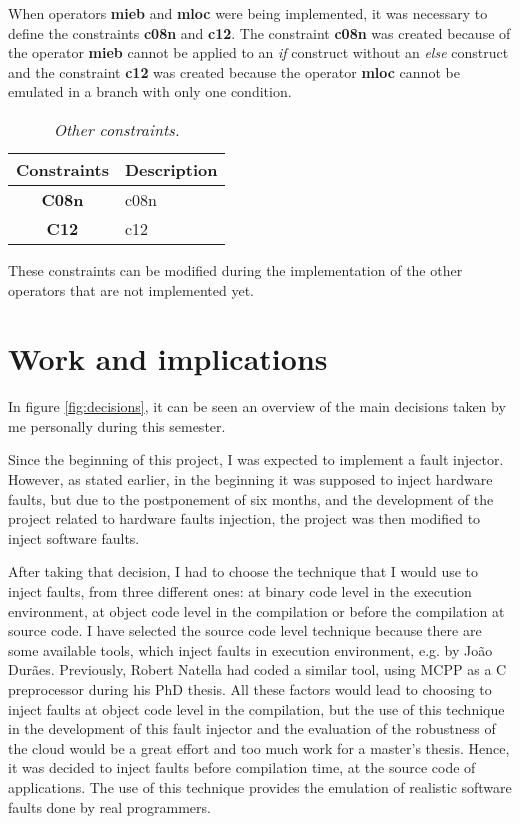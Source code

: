 When operators \textbf{\ac{mieb}} and \textbf{\ac{mloc}} were being implemented, it was necessary to define the constraints \textbf{\ac{c08n}} and \textbf{\ac{c12}}. The constraint \textbf{\ac{c08n}} was created because of the operator \textbf{\ac{mieb}} cannot be applied to an \textit{if} construct without an \textit{else} construct and the constraint \textbf{\ac{c12}} was created because the operator \textbf{\ac{mloc}} cannot be emulated in a branch with only one condition.

\begin{table}[!ht]
\centering
\begin{tabular}{|c|p{12cm}|}
\hline
\textbf{Constraints}            & \multicolumn{1}{c|}{\textbf{Description}}                                     \\ \hline \hline
\textbf{C08n}         & \Acl{c08n} \\ \hline
\textbf{C12}         & \Acl{c12} \\ \hline
\end{tabular}
\caption{\small \sl Other constraints.\label{tab:otherConstraints}}
\end{table}

These constraints can be modified during the implementation of the other operators that are not implemented yet.

\clearpage
\section{Work and implications}

In figure \ref{fig:decisions}, it can be seen an overview of the main decisions taken by me personally during this semester.

Since the beginning of this project, I was expected to implement a fault injector. However, as stated earlier, in the beginning it was supposed to inject hardware faults, but due to the postponement of six months, and the development of the project related to hardware faults injection, the project was then modified to inject software faults.

After taking that decision, I had to choose the technique that I would use to inject faults, from three different ones: at binary code level in the execution environment, at object code level in the compilation or before the compilation at source code. I have selected the source code level technique because there are some available tools, which inject faults in execution environment, e.g. by João Durães. Previously, Robert Natella had coded a similar tool, using MCPP as a C preprocessor during his PhD thesis.
All these factors would lead to choosing to inject faults at object code level in the compilation, but the use of this technique in the development of this fault injector and the evaluation of the robustness of the cloud would be a great effort and too much work for a master's thesis. Hence, it was decided to inject faults before compilation time, at the source code of applications. The use of this technique provides the emulation of realistic software faults done by real programmers.

